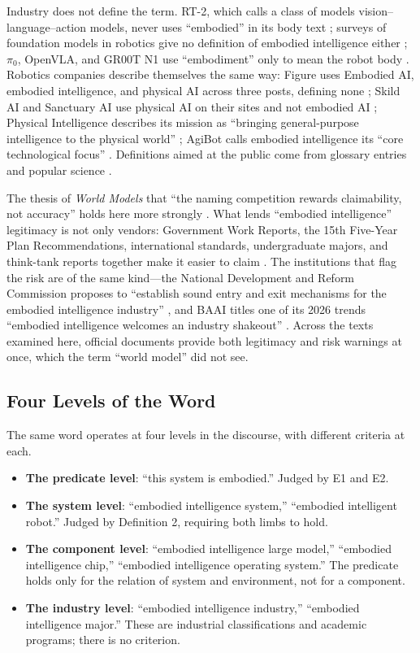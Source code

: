 \documentclass[10pt]{article}
\begin{document}
Industry does not define the term. RT-2, which calls a class of models vision--language--action models, never uses ``embodied'' in its body text \cite{brohan2023}; surveys of foundation models in robotics give no definition of embodied intelligence either \cite{firoozi2025}; $\pi_0$, OpenVLA, and GR00T N1 use ``embodiment'' only to mean the robot body \cite{black2024,kim2024,nvidiagroot2025}. Robotics companies describe themselves the same way: Figure uses Embodied AI, embodied intelligence, and physical AI across three posts, defining none \cite{figure_helix,figure_seriesc,figure_f03}; Skild AI and Sanctuary AI use physical AI on their sites and not embodied AI \cite{skild,sanctuary}; Physical Intelligence describes its mission as ``bringing general-purpose intelligence to the physical world'' \cite{pi}; AgiBot calls embodied intelligence its ``core technological focus'' \cite{agibot}. Definitions aimed at the public come from glossary entries and popular science \cite{nvglossary,livescience2024}.

The thesis of \textit{World Models} that ``the naming competition rewards claimability, not accuracy'' holds here more strongly \cite{yu2026wm}. What lends ``embodied intelligence'' legitimacy is not only vendors: Government Work Reports, the 15th Five-Year Plan Recommendations, international standards, undergraduate majors, and think-tank reports together make it easier to claim \cite{plan2026,itu2025}. The institutions that flag the risk are of the same kind---the National Development and Reform Commission proposes to ``establish sound entry and exit mechanisms for the embodied intelligence industry'' \cite{ndrc2025}, and BAAI titles one of its 2026 trends ``embodied intelligence welcomes an industry shakeout'' \cite{baai2026}. Across the texts examined here, official documents provide both legitimacy and risk warnings at once, which the term ``world model'' did not see.

\subsection{Four Levels of the Word}\label{sec:levels}

The same word operates at four levels in the discourse, with different criteria at each.

\begin{itemize}
\item \textbf{The predicate level}: ``this system is embodied.'' Judged by E1 and E2.
\item \textbf{The system level}: ``embodied intelligence system,'' ``embodied intelligent robot.'' Judged by Definition 2, requiring both limbs to hold.
\item \textbf{The component level}: ``embodied intelligence large model,'' ``embodied intelligence chip,'' ``embodied intelligence operating system.'' The predicate holds only for the relation of system and environment, not for a component.
\item \textbf{The industry level}: ``embodied intelligence industry,'' ``embodied intelligence major.'' These are industrial classifications and academic programs; there is no criterion.
\end{itemize}
\end{document}

